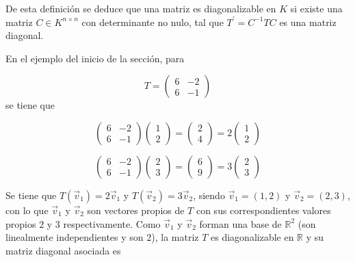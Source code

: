 \bigskip
\noindent
De esta definición se deduce que una matriz es diagonalizable en $K$ si existe una matriz $C\in K^{n \times n}$ con determinante no nulo, tal que $T^\prime=C^{-1}TC$ es una matriz diagonal.

\bigskip





\noindent
En el ejemplo del inicio de la sección, para 

$$T=\left(\begin{array}{cc}  6 & -2  \\ 6 &  -1
\end{array}
 \right)$$
 \noindent
se tiene que 
 
 
$$\left(\begin{array}{cc}  6 & -2  \\ 6 &  -1
\end{array}
 \right) \left(\begin{array}{c}  1   \\ 2 
\end{array}
 \right) = \left(\begin{array}{c}  2  \\ 4 
\end{array}
 \right)  = 2 \left(\begin{array}{c}  1  \\ 2 
\end{array}
 \right)  $$
 
\bigskip

$$\left(\begin{array}{cc}  6 & -2  \\ 6 &  -1
\end{array}
 \right) \left(\begin{array}{c}  2   \\  3
\end{array}
 \right) = \left(\begin{array}{c}  6  \\ 9 
\end{array}
 \right)  = 3 \left(\begin{array}{c}  2  \\ 3 
\end{array}
 \right)  $$

\bigskip

Se tiene que $T(\vec{v}_1)=  2 \vec{v}_1$ y  $T(\vec{v}_2)=  3 \vec{v}_2$, siendo    $\vec{v}_1=(1, 2)$ y $\vec{v}_2=(2, 3)$, con lo que $\vec{v}_1 $ y $ \vec{v}_2$ son vectores propios de $T$ con sus correspondientes valores propios $2$ y $3$ respectivamente.
Como $\vec{v}_1$ y $\vec{v}_2$  forman una base de $\mathbb{R}^2$ (son linealmente independientes y son $2$), la matriz $T$ es diagonalizable en $\mathbb{R}$ y su matriz diagonal asociada es 

